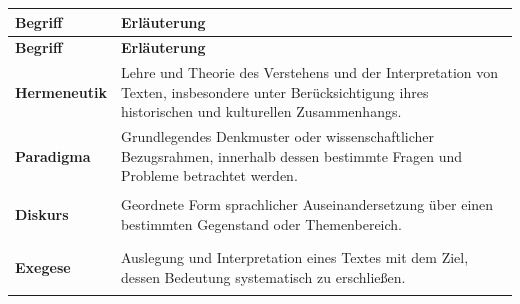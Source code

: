 \documentclass[11pt,a4paper]{article}
\begin{document}
\begin{longtable}{@{}p{5cm}p{21cm}@{}}


\toprule

\textbf{Begriff}
&
\textbf{Erläuterung}

\\

\midrule

\endfirsthead

\toprule

\textbf{Begriff}
&
\textbf{Erläuterung}

\\

\midrule

\endhead


\bottomrule

\endfoot


\hypertarget{glossar:Hermeneutik}{}
\textbf{Hermeneutik}
&
Lehre und Theorie des Verstehens und der Interpretation
von Texten, insbesondere unter Berücksichtigung ihres
historischen und kulturellen Zusammenhangs.

\\[1cm]

\hypertarget{glossar:Paradigma}{}
\textbf{Paradigma}
&
Grundlegendes Denkmuster oder wissenschaftlicher
Bezugsrahmen, innerhalb dessen bestimmte Fragen
und Probleme betrachtet werden.

\\[1cm]

\hypertarget{glossar:Diskurs}{}
\textbf{Diskurs}
&
Geordnete Form sprachlicher Auseinandersetzung über
einen bestimmten Gegenstand oder Themenbereich.

\\[1cm]

\hypertarget{glossar:Exegese}{}
\textbf{Exegese}
&
Auslegung und Interpretation eines Textes mit dem Ziel,
dessen Bedeutung systematisch zu erschließen.

\\[1cm]

\end{longtable}
\end{document}

